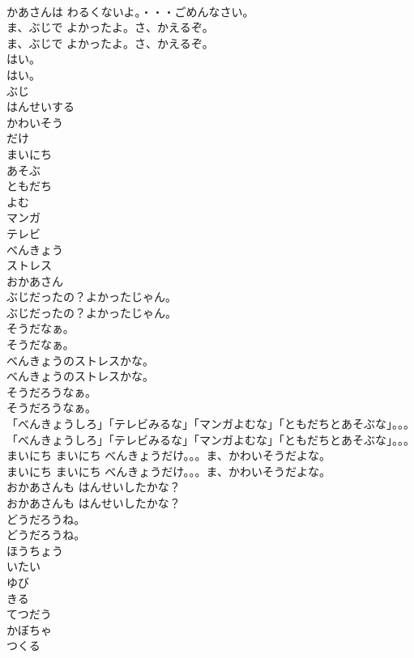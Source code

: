 \documentclass[8pt]{extreport}
\begin{document}
\begin{CJK}{UTF8}{min}
\\	かあさんは わるくないよ。・・・ごめんなさい。
\\	ま、ぶじで よかったよ。さ、かえるぞ。
\\	ま、ぶじで よかったよ。さ、かえるぞ。
\\	はい。
\\	はい。
\\	ぶじ
\\	はんせいする
\\	かわいそう
\\	だけ
\\	まいにち
\\	あそぶ
\\	ともだち
\\	よむ
\\	マンガ
\\	テレビ
\\	べんきょう
\\	ストレス
\\	おかあさん
\\	ぶじだったの？よかったじゃん。
\\	ぶじだったの？よかったじゃん。
\\	そうだなぁ。
\\	そうだなぁ。
\\	べんきょうのストレスかな。
\\	べんきょうのストレスかな。
\\	そうだろうなぁ。
\\	そうだろうなぁ。
\\	「べんきょうしろ」「テレビみるな」「マンガよむな」「ともだちとあそぶな」。。。
\\	「べんきょうしろ」「テレビみるな」「マンガよむな」「ともだちとあそぶな」。。。
\\	まいにち まいにち べんきょうだけ。。。ま、かわいそうだよな。
\\	まいにち まいにち べんきょうだけ。。。ま、かわいそうだよな。
\\	おかあさんも はんせいしたかな？
\\	おかあさんも はんせいしたかな？
\\	どうだろうね。
\\	どうだろうね。
\\	ほうちょう
\\	いたい
\\	ゆび
\\	きる
\\	てつだう
\\	かぼちゃ
\\	つくる

\end{CJK}
\end{document}
